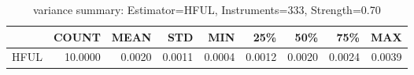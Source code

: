 \begin{table}[ht]
\centering
\caption{variance summary: Estimator=HFUL, Instruments=333, Strength=0.70}
\begin{tabular}{lrrrrrrrr}
\toprule
 & COUNT & MEAN & STD & MIN & 25\% & 50\% & 75\% & MAX \\
\midrule
HFUL & 10.0000 & 0.0020 & 0.0011 & 0.0004 & 0.0012 & 0.0020 & 0.0024 & 0.0039 \\
\bottomrule
\end{tabular}
\end{table}

